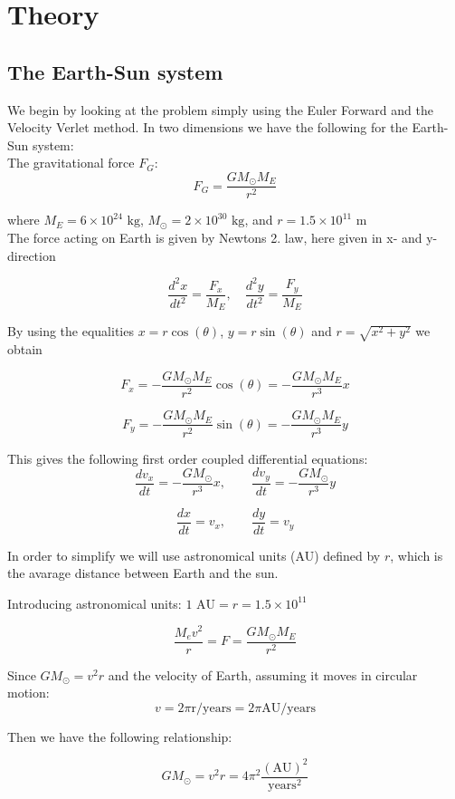 \documentclass[../main.tex]{subfiles}
\begin{document}
\section{Theory}\label{theory}
\subsection{The Earth-Sun system}
We begin by looking at the problem simply using the Euler Forward and the Velocity Verlet method.
In two dimensions we have the following for the Earth-Sun system: \\

\noindent The gravitational force $F_G$:
$$F_G= \frac{GM_{\odot}M_E}{r^2}$$

where $M_E = 6\times 10^{24}\text{ kg}$,  $ M_{\odot} = 2\times 10^{30}\text{ kg}$, and  $r = 1.5\times 10^{11}\text{ m}$\\
The force acting on Earth is given by Newtons 2. law, here given in x- and y- direction

$$ \frac{d^2x}{dt^2} = \frac{F_x}{M_E}, \quad \frac{d^2y}{dt^2} = \frac{F_y}{M_E}$$

By using the equalities $x = r \cos(\theta)$,  $y = r\sin(\theta)$ and $r = \sqrt{x^2 +y^2}$ we obtain

$$F_x = - \frac{GM_{\odot}M_E}{r^2} \cos(\theta) =- \frac{GM_{\odot}M_E}{r^3}x$$

$$F_y = - \frac{GM_{\odot}M_E}{r^2}\sin(\theta) =- \frac{GM_{\odot}M_E}{r^3}y$$


This gives the following first order  coupled differential equations:
$$ \frac{dv_x}{dt} = - \frac{GM_{\odot}}{r^3}x,\qquad \frac{dv_y}{dt} = - \frac{GM_{\odot}}{r^3}y$$

  $$\frac{dx}{dt} = v_x,\qquad \frac{dy}{dt} = v_y$$

In order to simplify we will use astronomical units (AU) defined by $r$, which is the avarage distance between Earth and the sun.

Introducing astronomical units: $1\text{ AU}= r = 1.5 \times 10^{11}$


$$ \frac{M_ev^2}{r} = F = \frac{GM_{\odot}M_E}{r^2}$$


Since $GM_{\odot} = v^2r$ and the velocity of Earth, assuming it moves in circular motion: $$v = 2\pi \text{r/years}= 2\pi \text{AU/years}$$

Then we have the following relationship:

$$GM_{\odot} = v^2r = 4\pi^2 \frac{(\text{AU})^2}{\text{years}^2}$$
\end{document}
